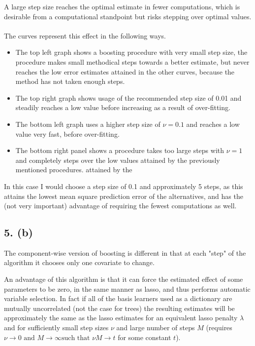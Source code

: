 \documentclass[a4paper, 10pt, english]{article}
\begin{document}
A large step size reaches the optimal estimate in fewer computations, which is desirable from a computational
standpoint but risks stepping over optimal values.

\paragraph*{} The curves represent this effect in the following ways. 
\begin{itemize}
    \item The top left graph shows a boosting procedure
	with very small step size, the procedure makes small methodical steps towards a better estimate, but
	never reaches the low error estimates attained in the other curves, because the method has not taken
	enough steps.
    \item The top right graph shows usage of the recommended step size of 0.01 and steadily reaches a low
	value before increasing as a result of over-fitting.
    \item The bottom left graph uses a higher step size of $\nu = 0.1$ and reaches a low value very fast,
	before over-fitting.
    \item The bottom right panel shows a procedure takes too large steps with $\nu = 1$ and completely steps
	over the low values attained by the previously mentioned procedures.
	attained by the 
\end{itemize}

In this case I would choose a step size of 0.1 and approximately 5 steps, as this attains the lowest mean
square prediction error of the alternatives, and has the (not very important) advantage of requiring the
fewest computations as well.

\subsection{5. (b)}
The component-wise version of boosting is different in that at each "step" of the algorithm it chooses only
one covariate to change.

An advantage of this algorithm is that it can force the estimated effect of some parameters to be zero, in the
same manner as lasso, and thus performs automatic variable selection. In fact if all of the basis learners
used as a dictionary are mutually uncorrelated (not the case for trees) the resulting estimates will be
approximately the same as the lasso estimates for an equivalent lasso penalty $\lambda$ and for sufficiently
small step sizes $\nu$ and large number of steps $M$ (requires $\nu \to 0 \text{ and } M \to \infty \text{
such that } \nu M \to t$ for some constant $t$).
\end{document}
